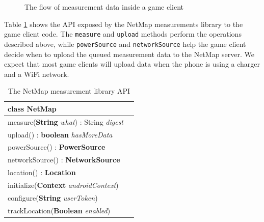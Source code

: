 \begin{figure}[hbtp]
  \caption{
    The flow of measurement data inside a game client
  }
  \label{fig:dataflow}
\end{figure}

Table \ref{table:api} shows the API exposed by the NetMap measurements library
to the game client code. The \texttt{measure} and \texttt{upload} methods
perform the operations described above, while \texttt{powerSource} and
\texttt{networkSource} help the game client decide when to upload the queued
measurement data to the NetMap server. We expect that most game clients will
upload data when the phone is using a charger and a WiFi network.

\begin{table}[hbtp]
\begin{tabular}{|p{6.25cm}|p{1.5cm}|}
\hline
\textbf{class NetMap}\\
\hline
\hline
measure(\textbf{String} \textit{what}) : String \textit{digest}\\
\hline
upload() : \textbf{boolean} \textit{hasMoreData}\\
\hline
\hline
powerSource() : \textbf{PowerSource}\\
\hline
networkSource() : \textbf{NetworkSource}\\
\hline
location() : \textbf{Location}\\
\hline
\hline
initialize(\textbf{Context} \textit{androidContext})\\
\hline
configure(\textbf{String} \textit{userToken})\\
\hline
trackLocation(\textbf{Boolean} \textit{enabled})\\
\hline
\end{tabular}
\caption{
  The NetMap measurement library API
}
\label{table:api}
\end{table}

